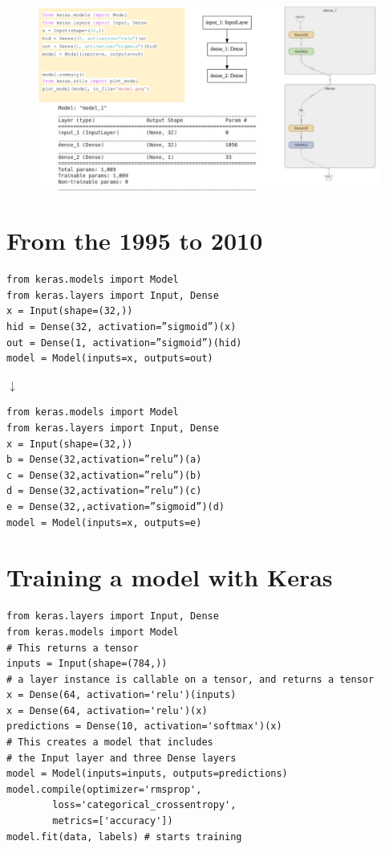 \begin{figure}[ht]
	\centering
	\includegraphics[width=1\linewidth]{figure_ml/modernized_mlp.png}
\end{figure}
\FloatBarrier

\section{From the 1995 to 2010}

\begin{verbatim}
from keras.models import Model
from keras.layers import Input, Dense
x = Input(shape=(32,))
hid = Dense(32, activation=”sigmoid”)(x)
out = Dense(1, activation=”sigmoid”)(hid)
model = Model(inputs=x, outputs=out)
\end{verbatim}

\begin{center}
	$\downarrow$
\end{center}

\begin{verbatim}
from keras.models import Model
from keras.layers import Input, Dense
x = Input(shape=(32,))
b = Dense(32,activation=”relu”)(a)
c = Dense(32,activation=”relu”)(b)
d = Dense(32,activation=”relu”)(c)
e = Dense(32,,activation=”sigmoid”)(d)
model = Model(inputs=x, outputs=e)
\end{verbatim}

\section{Training a model with Keras}

\begin{verbatim}
from keras.layers import Input, Dense
from keras.models import Model
# This returns a tensor
inputs = Input(shape=(784,))
# a layer instance is callable on a tensor, and returns a tensor
x = Dense(64, activation='relu')(inputs)
x = Dense(64, activation='relu')(x)
predictions = Dense(10, activation='softmax')(x)
# This creates a model that includes
# the Input layer and three Dense layers
model = Model(inputs=inputs, outputs=predictions)
model.compile(optimizer='rmsprop',
		loss='categorical_crossentropy',
		metrics=['accuracy'])
model.fit(data, labels) # starts training
\end{verbatim}




